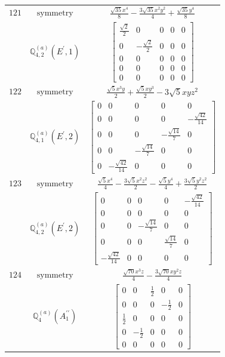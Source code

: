 \documentclass[fleqn,8pt,landscape]{jsarticle}
\begin{document}
\begin{longtable}{ccc}
$ 121 $ & $ \text{symmetry} $ & $ \frac{\sqrt{35} x^{4}}{8} - \frac{3 \sqrt{35} x^{2} y^{2}}{4} + \frac{\sqrt{35} y^{4}}{8} $ \\
$  $ & $ \mathbb{Q}_{4,2}^{(a)}(E^{\prime},1) $ & $ \begin{bmatrix} \frac{\sqrt{2}}{2} & 0 & 0 & 0 & 0 \\ 0 & - \frac{\sqrt{2}}{2} & 0 & 0 & 0 \\ 0 & 0 & 0 & 0 & 0 \\ 0 & 0 & 0 & 0 & 0 \\ 0 & 0 & 0 & 0 & 0 \end{bmatrix} $ \\ \hline
$ 122 $ & $ \text{symmetry} $ & $ \frac{\sqrt{5} x^{3} y}{2} + \frac{\sqrt{5} x y^{3}}{2} - 3 \sqrt{5} x y z^{2} $ \\
$  $ & $ \mathbb{Q}_{4,1}^{(a)}(E^{\prime},2) $ & $ \begin{bmatrix} 0 & 0 & 0 & 0 & 0 \\ 0 & 0 & 0 & 0 & - \frac{\sqrt{42}}{14} \\ 0 & 0 & 0 & - \frac{\sqrt{14}}{7} & 0 \\ 0 & 0 & - \frac{\sqrt{14}}{7} & 0 & 0 \\ 0 & - \frac{\sqrt{42}}{14} & 0 & 0 & 0 \end{bmatrix} $ \\ \hline
$ 123 $ & $ \text{symmetry} $ & $ \frac{\sqrt{5} x^{4}}{4} - \frac{3 \sqrt{5} x^{2} z^{2}}{2} - \frac{\sqrt{5} y^{4}}{4} + \frac{3 \sqrt{5} y^{2} z^{2}}{2} $ \\
$  $ & $ \mathbb{Q}_{4,2}^{(a)}(E^{\prime},2) $ & $ \begin{bmatrix} 0 & 0 & 0 & 0 & - \frac{\sqrt{42}}{14} \\ 0 & 0 & 0 & 0 & 0 \\ 0 & 0 & - \frac{\sqrt{14}}{7} & 0 & 0 \\ 0 & 0 & 0 & \frac{\sqrt{14}}{7} & 0 \\ - \frac{\sqrt{42}}{14} & 0 & 0 & 0 & 0 \end{bmatrix} $ \\ \hline
$ 124 $ & $ \text{symmetry} $ & $ \frac{\sqrt{70} x^{3} z}{4} - \frac{3 \sqrt{70} x y^{2} z}{4} $ \\
$  $ & $ \mathbb{Q}_{4}^{(a)}(A_{1}^{\prime\prime}) $ & $ \begin{bmatrix} 0 & 0 & \frac{1}{2} & 0 & 0 \\ 0 & 0 & 0 & - \frac{1}{2} & 0 \\ \frac{1}{2} & 0 & 0 & 0 & 0 \\ 0 & - \frac{1}{2} & 0 & 0 & 0 \\ 0 & 0 & 0 & 0 & 0 \end{bmatrix} $ \\ \hline

\end{longtable}
\end{document}
